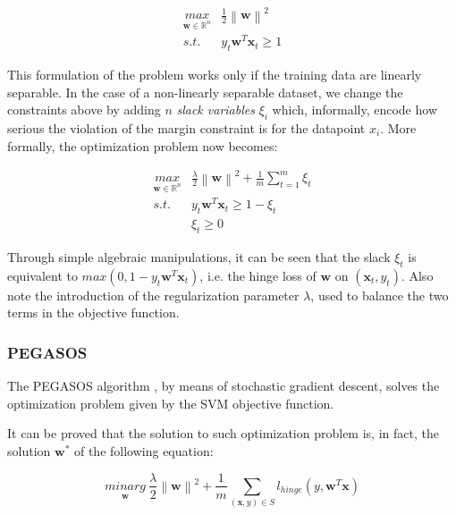 \documentclass[a4paper]{article}
\begin{document}
\begin{equation}
\begin{matrix}
\underset{\boldsymbol{w} \in \mathbb{R}^n}{max} & \frac{1}{2} \left \| \boldsymbol{w} \right \|^2
\\ 
s.t. & y_t \boldsymbol{w}^T \boldsymbol{x}_t \ge 1
\end{matrix}
\end{equation}

This formulation of the problem works only if the training data are linearly separable. In the case of a non-linearly separable dataset, we change the constraints above by adding \(n\) \emph{slack variables} \(\xi_i\) which, informally, encode how serious the violation of the margin constraint is for the datapoint \(x_i\). More formally, the optimization problem now becomes:

\begin{equation}
\begin{matrix}
\underset{\boldsymbol{w} \in \mathbb{R}^n}{max} & \frac{\lambda}{2} \left \| \boldsymbol{w} \right \|^2 + \frac{1}{m}\sum_{t=1}^{m}{\xi_t}
\\ 
s.t. & y_t \boldsymbol{w}^T \boldsymbol{x}_t \ge 1 - \xi_t
\\
& \xi_t \ge 0
\end{matrix}
\end{equation}

Through simple algebraic manipulations, it can be seen that the slack \(\xi_t\) is equivalent to \(max(0, 1 - y_t \boldsymbol{w}^T \boldsymbol{x}_t)\), i.e. the hinge loss of \(\boldsymbol{w}\) on \((\boldsymbol{x}_t, y_t)\). Also note the introduction of the regularization parameter \(\lambda\), used to balance the two terms in the objective function.

\subsubsection{PEGASOS}
\label{sec:org7f3a8d7}

The PEGASOS algorithm \cite{pegasos}, by means of stochastic gradient descent, solves the optimization problem given by the SVM objective function.

It can be proved that the solution to such optimization problem is, in fact, the solution \(\boldsymbol{w}^*\) of the following equation:

\begin{equation}
\underset{\boldsymbol{w}}{minarg} \:  \frac{\lambda}{2}\left \| \boldsymbol{w} \right \|^2 + \frac{1}{m} \sum_{(\boldsymbol{x},y) \in S} l_{hinge}(y, \boldsymbol{w}^T \boldsymbol{x} )
\end{equation}
\end{document}
